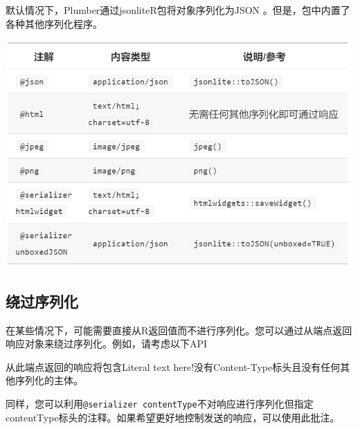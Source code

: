 \documentclass[]{book}
\newenvironment{Shaded}{\begin{snugshade}}{\end{snugshade}}
\newcommand{\StringTok}[1]{\textcolor[rgb]{0.31,0.60,0.02}{#1}}
\newcommand{\CommentTok}[1]{\textcolor[rgb]{0.56,0.35,0.01}{\textit{#1}}}
\newcommand{\ControlFlowTok}[1]{\textcolor[rgb]{0.13,0.29,0.53}{\textbf{#1}}}
\newcommand{\OperatorTok}[1]{\textcolor[rgb]{0.81,0.36,0.00}{\textbf{#1}}}
\newcommand{\NormalTok}[1]{#1}
\begin{document}
默认情况下，Plumber通过jsonliteR包将对象序列化为JSON
。但是，包中内置了各种其他序列化程序。

\includegraphics{pic/plumber/p5.png}

\subsection{绕过序列化}

在某些情况下，可能需要直接从R返回值而不进行序列化。您可以通过从端点返回响应对象来绕过序列化。例如，请考虑以下API

\begin{Shaded}
\end{Shaded}

从此端点返回的响应将包含Literal text
here!没有Content-Type标头且没有任何其他序列化的主体。

同样，您可以利用\texttt{@serializer\ contentType}不对响应进行序列化但指定contentType标头的注释。如果希望更好地控制发送的响应，可以使用此批注。
\end{document}
